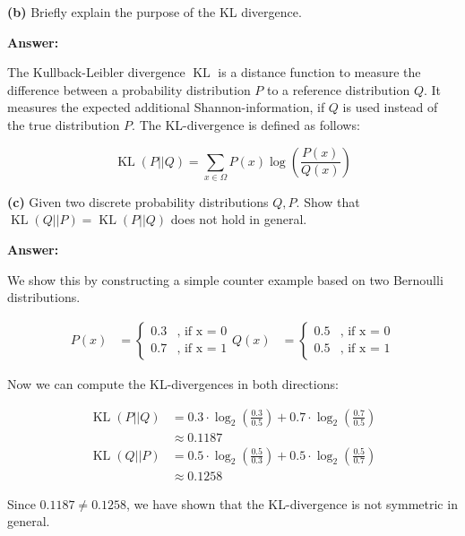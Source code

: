 \textbf{(b)} Briefly explain the purpose of the KL divergence.

\textbf{Answer:}

The Kullback-Leibler divergence $\operatorname{KL}$ is a distance function to measure the difference between a probability distribution $P$ to a reference distribution $Q$. It measures the expected additional Shannon-information, if $Q$ is used instead of the true distribution $P$. The KL-divergence is defined as follows:

\begin{equation}
	\operatorname{KL}(P||Q) = \sum_{x \in \Omega} P(x) \log \left( \frac{P(x)}{Q(x)} \right)
\end{equation}

\textbf{(c)} Given two discrete probability distributions $Q, P$. Show that $\operatorname{KL}(Q || P) = \operatorname{KL}(P || Q)$ does not hold in general.

\textbf{Answer:}

We show this by constructing a simple counter example based on two Bernoulli distributions. 

\begin{align}
	P(x) &= \left\{
		\begin{array}{ll}
			0.3 & \text{, if x = 0} \\
			0.7 & \text{, if x = 1}
		\end{array} \right.
	Q(x) &= \left\{
		\begin{array}{ll}
			0.5 & \text{, if x = 0} \\
			0.5 & \text{, if x = 1}
		\end{array} \right.
\end{align}

Now we can compute the KL-divergences in both directions:

\begin{align}
	\operatorname{KL}(P||Q) &= 0.3 \cdot \log_2 \left( \frac{0.3}{0.5}\right) + 0.7 \cdot \log_2 \left( \frac{0.7}{0.5}\right) \\
	& \approx 0.1187 \\
	\operatorname{KL}(Q||P) &= 0.5 \cdot \log_2 \left( \frac{0.5}{0.3}\right) + 0.5 \cdot \log_2 \left( \frac{0.5}{0.7}\right) \\
	& \approx 0.1258
\end{align}

Since $0.1187 \neq 0.1258$, we have shown that the KL-divergence is not symmetric in general.


